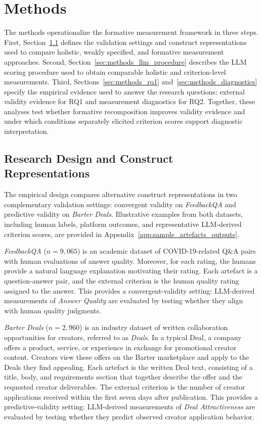 
\section{Methods}\label{sec:methods}

The methods operationalize the formative measurement framework in three steps. First, Section~\ref{sec:methods_design} defines the validation settings and construct representations used to compare holistic, weakly specified, and formative measurement approaches. Second, Section~\ref{sec:methods_llm_procedure} describes the LLM scoring procedure used to obtain comparable holistic and criterion-level measurements. Third, Sections~\ref{sec:methods_rq1} and~\ref{sec:methods_diagnostics} specify the empirical evidence used to answer the research questions: external validity evidence for RQ1 and measurement diagnostics for RQ2. Together, these analyses test whether formative recomposition improves validity evidence and under which conditions separately elicited criterion scores support diagnostic interpretation.


\subsection{Research Design and Construct Representations}\label{sec:methods_design}

The empirical design compares alternative construct representations in two complementary validation settings: convergent validity on \textit{FeedbackQA} and predictive validity on \textit{Barter Deals}. Illustrative examples from both datasets, including human labels, platform outcomes, and representative LLM-derived criterion scores, are provided in Appendix~\ref{app:sample_artefacts_outputs}.

\textit{FeedbackQA} \citep{li_using_2022} ($n=9{,}065$) is an academic dataset of COVID-19-related Q\&A pairs with human evaluations of answer quality. Moreover, for each rating, the humans provide a natural language explanation motivating their rating. Each artefact is a question-answer pair, and the external criterion is the human quality rating assigned to the answer. This provides a convergent-validity setting: LLM-derived measurements of \textit{Answer Quality} are evaluated by testing whether they align with human quality judgments.

\textit{Barter Deals} ($n=2{,}960$) is an industry dataset of written collaboration opportunities for creators, referred to as \textit{Deals}. In a typical Deal, a company offers a product, service, or experience in exchange for promotional creator content. Creators view these offers on the Barter marketplace and apply to the Deals they find appealing. Each artefact is the written Deal text, consisting of a title, body, and requirements section that together describe the offer and the requested creator deliverables. The external criterion is the number of creator applications received within the first seven days after publication. This provides a predictive-validity setting: LLM-derived measurements of \textit{Deal Attractiveness} are evaluated by testing whether they predict observed creator application behavior. 

